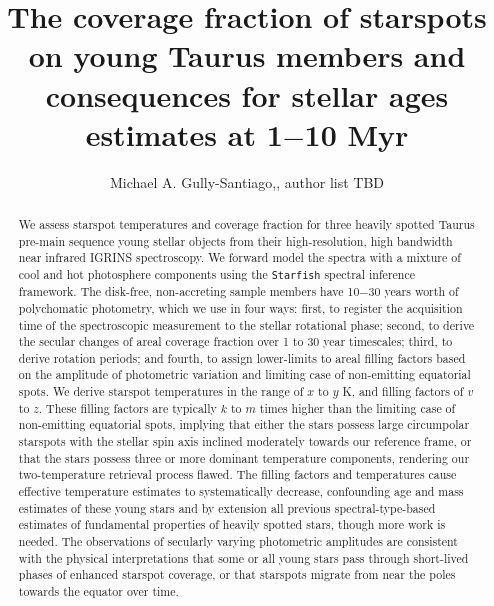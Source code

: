 \documentclass[twocolumn]{emulateapj}%
\begin{document}
\title{The coverage fraction of starspots on young Taurus members and consequences for stellar ages estimates at 1$-$10 Myr}

\author{Michael A. Gully-Santiago,, author list TBD}



\begin{abstract}

We assess starspot temperatures and coverage fraction for three heavily spotted Taurus pre-main sequence young stellar objects from their high-resolution, high bandwidth near infrared IGRINS spectroscopy.  We forward model the spectra with a mixture of cool and hot photosphere components using the \texttt{Starfish} spectral inference framework.  The disk-free, non-accreting sample members have 10$-$30 years worth of polychomatic photometry, which we use in four ways: first, to register the acquisition time of the spectroscopic measurement to the stellar rotational phase; second, to derive the secular changes of areal coverage fraction over 1 to 30 year timescales; third, to derive rotation periods; and fourth, to assign lower-limits to areal filling factors based on the amplitude of photometric variation and limiting case of non-emitting equatorial spots.  We derive starspot temperatures in the range of $x$ to $y$ K, and filling factors of $v$ to $z$.  These filling factors are typically $k$ to $m$ times higher than the limiting case of non-emitting equatorial spots, implying that either the stars possess large circumpolar starspots with the stellar spin axis inclined moderately towards our reference frame, or that the stars possess three or more dominant temperature components, rendering our two-temperature retrieval process flawed.  The filling factors and temperatures cause effective temperature estimates to systematically decrease, confounding age and mass estimates of these young stars and by extension all previous spectral-type-based estimates of fundamental properties of heavily spotted stars, though more work is needed.  The observations of secularly varying photometric amplitudes are consistent with the physical interpretations that some or all young stars pass through short-lived phases of enhanced starspot coverage, or that starspots migrate from near the poles towards the equator over time.

\end{abstract}

\end{document}
